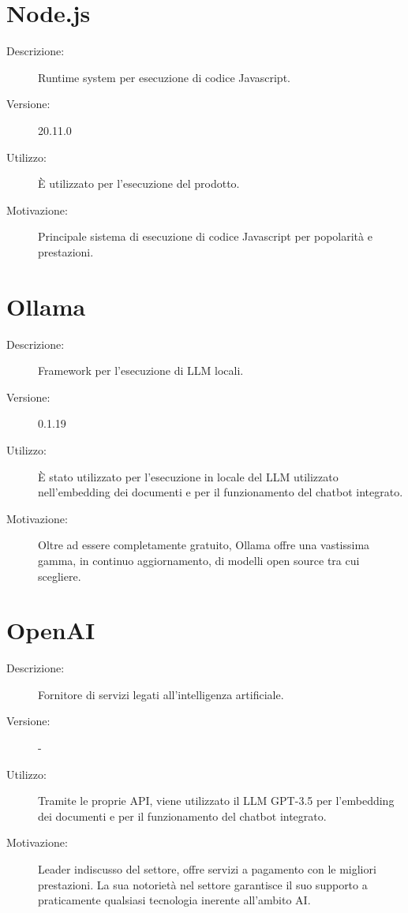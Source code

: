 \section{Node.js}
\begin{description}
\item[Descrizione:] Runtime system per esecuzione di codice Javascript.
\item[Versione:] 20.11.0
\item[Utilizzo:] È utilizzato per l'esecuzione del prodotto.
\item[Motivazione:] Principale sistema di esecuzione di codice Javascript per popolarità e prestazioni.
\end{description}

\section{Ollama}
\begin{description}
\item[Descrizione:] Framework per l'esecuzione di LLM locali.
\item[Versione:] 0.1.19
\item[Utilizzo:] È stato utilizzato per l'esecuzione in locale del LLM utilizzato nell'embedding dei documenti e per il funzionamento del chatbot integrato.
\item[Motivazione:] Oltre ad essere completamente gratuito, Ollama offre una vastissima gamma, in continuo aggiornamento, di modelli open source tra cui scegliere.
\end{description}

\section{OpenAI}
\begin{description}
\item[Descrizione:] Fornitore di servizi legati all'intelligenza artificiale.
\item[Versione:] -
\item[Utilizzo:] Tramite le proprie API, viene utilizzato il LLM GPT-3.5 per l'embedding dei documenti e per il funzionamento del chatbot integrato.
\item[Motivazione:] Leader indiscusso del settore, offre servizi a pagamento con le migliori prestazioni. La sua notorietà nel settore garantisce il suo supporto a praticamente qualsiasi tecnologia inerente all'ambito AI.
\end{description}

